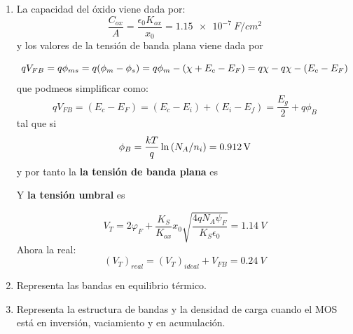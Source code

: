 \begin{enumerate}[label=\alph*)]
	\item La capacidad del óxido viene dada por:
	\begin{equation*}
		\frac{C_{ox}}{A} = \frac{\epsilon_0 K_{ox}}{x_0} = \SI{1.15e-7}{F/cm^{2}}
	\end{equation*}
	y los valores de la tensión de banda plana viene dada por

	\begin{equation*}
		qV_{FB} = q\phi_{ms} = q(\phi_m - \phi_s) = q\phi_m -  \left( \chi + E_c - E_F \right) = q \chi - q \chi -  \left( E_c  - E_F \right)
	\end{equation*}
	que podmeos simplificar como:
	\begin{equation*}
		qV_{FB} =  (E_c - E_F) = (E_c - E_i) + (E_i - E_f) = \frac{E_g}{2} + q\phi_B
	\end{equation*}
	tal que si
	\begin{equation*}
		\phi_B = \frac{kT}{q} \ln \left( N_A/n_i \right) = \SI{0.912e+0}{V}
	\end{equation*}
	y por tanto la \textbf{la tensión de banda plana} es

	\begin{equation*}
	\end{equation*}
	Y \textbf{la tensión umbral} es

	\begin{equation*}
		V_T = 2\varphi_F + \frac{K_S}{K_{ox}}  x_0 \sqrt{\frac{4q N_A \psi_F}{K_S \epsilon_0}}  = \SI{1.14}{V}
	\end{equation*}
	Ahora la real:
	\begin{equation*}
		(V_T)_{real} =(V_T)_{ideal} + V_{FB} = \SI{0.24}{V}
	\end{equation*}
	\item Representa las bandas en equilibrio térmico.
	\item Representa la estructura de bandas y la densidad de carga cuando el MOS está en inversión, vaciamiento y en acumulación.
\end{enumerate}
\vspace*{2em}

